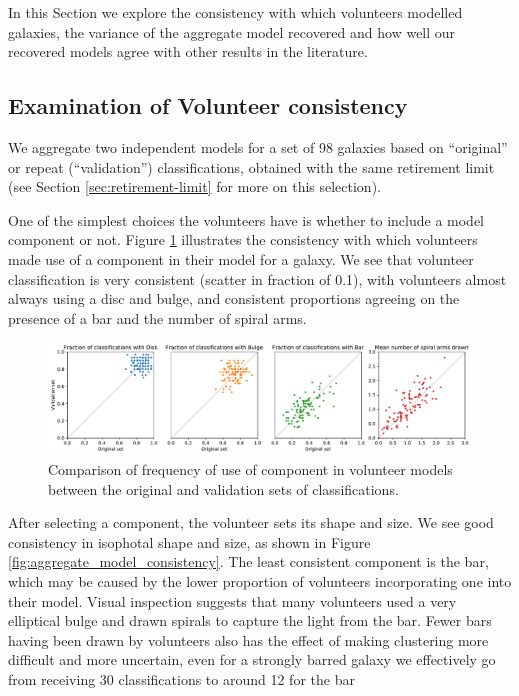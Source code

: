 \documentclass[../main.tex]{subfiles}
\begin{document}
\label{sec:results}

In this Section we explore the consistency with which volunteers modelled galaxies, the variance of the aggregate model recovered and how well our recovered models agree with other results in the literature.


\subsection{Examination of Volunteer consistency}
We aggregate two independent models for a set of 98 galaxies based on ``original'' or repeat (``validation'') classifications, obtained with the same retirement limit (see Section \ref{sec:retirement-limit} for more on this selection).

One of the simplest choices the volunteers have is whether to include a model component or not. Figure \ref{fig:volunteer_component_consistency} illustrates the consistency with which volunteers made use of a component in their model for a galaxy. We see that volunteer classification is very consistent (scatter in fraction of 0.1), with volunteers almost always using a disc and bulge, and consistent proportions agreeing on the presence of a bar and the number of spiral arms.

\begin{figure}
  \includegraphics[width=17.3cm]{images__results/component_frequency.pdf}
  \caption{Comparison of frequency of use of component in volunteer models between the original and validation sets of classifications.}
  \label{fig:volunteer_component_consistency}
\end{figure}

After selecting a component, the volunteer sets its shape and size. We see good consistency in isophotal shape and size, as shown in Figure \ref{fig:aggregate_model_consistency}. The least consistent component is the bar, which may be caused by the lower proportion of volunteers incorporating one into their model. Visual inspection suggests that many volunteers used a very elliptical bulge and drawn spirals to capture the light from the bar. Fewer bars having been drawn by volunteers also has the effect of making clustering more difficult and more uncertain, even for a strongly barred galaxy we effectively go from receiving 30 classifications to around 12 for the bar
\end{document}
